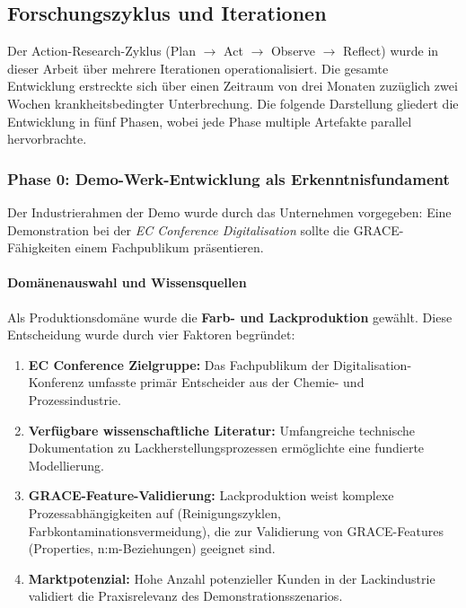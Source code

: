 \subsection{Forschungszyklus und Iterationen}
\label{subsec:Forschungszyklus}

Der Action-Research-Zyklus (Plan $\rightarrow$ Act $\rightarrow$ Observe $\rightarrow$ Reflect) wurde in dieser Arbeit über mehrere Iterationen operationalisiert. Die gesamte Entwicklung erstreckte sich über einen Zeitraum von drei Monaten zuzüglich zwei Wochen krankheitsbedingter Unterbrechung. Die folgende Darstellung gliedert die Entwicklung in fünf Phasen, wobei jede Phase multiple Artefakte parallel hervorbrachte.


\subsubsection{Phase 0: Demo-Werk-Entwicklung als Erkenntnisfundament}
\label{subsubsec:Phase0}

Der Industrierahmen der Demo wurde durch das Unternehmen vorgegeben: Eine Demonstration bei der \textit{EC Conference Digitalisation} sollte die GRACE-Fähigkeiten einem Fachpublikum präsentieren.

\paragraph{Domänenauswahl und Wissensquellen}

Als Produktionsdomäne wurde die \textbf{Farb- und Lackproduktion} gewählt. Diese Entscheidung wurde durch vier Faktoren begründet:

\begin{enumerate}
    \item \textbf{EC Conference Zielgruppe:} Das Fachpublikum der Digitalisation-Konferenz umfasste primär Entscheider aus der Chemie- und Prozessindustrie.
    \item \textbf{Verfügbare wissenschaftliche Literatur:} Umfangreiche technische Dokumentation zu Lackherstellungsprozessen ermöglichte eine fundierte Modellierung.
    \item \textbf{GRACE-Feature-Validierung:} Lackproduktion weist komplexe Prozessabhängigkeiten auf (Reinigungszyklen, Farbkontaminationsvermeidung), die zur Validierung von GRACE-Features (Properties, n:m-Beziehungen) geeignet sind.
    \item \textbf{Marktpotenzial:} Hohe Anzahl potenzieller Kunden in der Lackindustrie validiert die Praxisrelevanz des Demonstrationsszenarios.
\end{enumerate}

